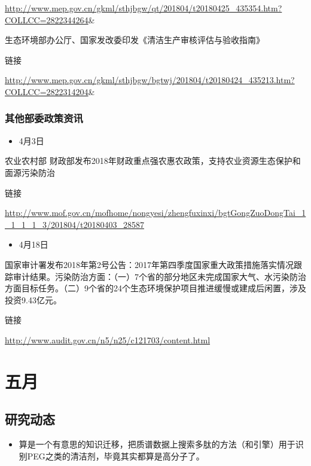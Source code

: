 \documentclass[]{book}
\providecommand{\tightlist}{%
  \setlength{\itemsep}{0pt}\setlength{\parskip}{0pt}}
\begin{document}
\url{http://www.mep.gov.cn/gkml/sthjbgw/qt/201804/t20180425_435354.htm?COLLCC=2822344264}\&

生态环境部办公厅、国家发改委印发《清洁生产审核评估与验收指南》

链接

\url{http://www.mep.gov.cn/gkml/sthjbgw/bgtwj/201804/t20180424_435213.htm?COLLCC=2822314204}\&

\subsubsection*{其他部委政策资讯}

\begin{itemize}
\tightlist
\item
  4月3日
\end{itemize}

农业农村部
财政部发布2018年财政重点强农惠农政策，支持农业资源生态保护和面源污染防治

链接

\url{http://www.mof.gov.cn/mofhome/nongyesi/zhengfuxinxi/bgtGongZuoDongTai_1_1_1_1_3/201804/t20180403_28587}

\begin{itemize}
\tightlist
\item
  4月18日
\end{itemize}

国家审计署发布2018年第2号公告：2017年第四季度国家重大政策措施落实情况跟踪审计结果。污染防治方面：（一）7个省的部分地区未完成国家大气、水污染防治方面目标任务。（二）9个省的24个生态环境保护项目推进缓慢或建成后闲置，涉及投资9.43亿元。

链接

\url{http://www.audit.gov.cn/n5/n25/c121703/content.html}

\section*{五月}

\subsection*{研究动态}\label{-6}

\begin{itemize}
\tightlist
\item
  算是一个有意思的知识迁移，把质谱数据上搜索多肽的方法（和引擎）用于识别PEG之类的清洁剂，毕竟其实都算是高分子了。
\end{itemize}
\end{document}
